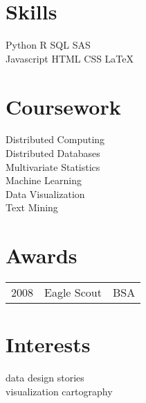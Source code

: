 \documentclass[]{deedy-resume-openfont}
\begin{document}
\begin{minipage}[t]{0.33\textwidth}

\section{Skills}
Python \textbullet{} R \textbullet{} SQL \textbullet{} SAS \textbullet{} \\
Javascript \textbullet{} HTML \textbullet{} CSS \textbullet{} \LaTeX\ \\ 
\sectionsep


\section{Coursework}
Distributed Computing \\
Distributed Databases \\
Multivariate Statistics \\
Machine Learning \\
Data Visualization \\
Text Mining \\
\sectionsep


\section{Awards} 
\begin{tabular}{rll}
	2008 & Eagle Scout & BSA \\
\end{tabular}
\sectionsep


\section{Interests}
data \textbullet{} design \textbullet{} stories \textbullet{} \\
visualization \textbullet{} cartography 

%
%

\end{minipage} 
\hfill
\end{document}

